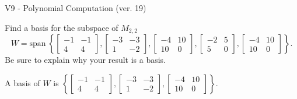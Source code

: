 \begin{exercise}
  \begin{exerciseTitle}V9 - Polynomial Computation (ver. 19)\end{exerciseTitle}
  \begin{exerciseStatement}
    Find a basis for the subspace of \(M_{2,2}\) 
\[W=\mathrm{span}\ \left\{\left[\begin{array}{cc}
-1 & -1 \\
4 & 4
\end{array}\right] , \left[\begin{array}{cc}
-3 & -3 \\
1 & -2
\end{array}\right] , \left[\begin{array}{cc}
-4 & 10 \\
10 & 0
\end{array}\right] , \left[\begin{array}{cc}
-2 & 5 \\
5 & 0
\end{array}\right] , \left[\begin{array}{cc}
-4 & 10 \\
10 & 0
\end{array}\right]\right\}.\]
 Be sure to explain why your result is a basis.


  \end{exerciseStatement}
  \begin{exerciseAnswer}
   A basis of \(W\) is  \(\left\{\left[\begin{array}{cc}
-1 & -1 \\
4 & 4
\end{array}\right] , \left[\begin{array}{cc}
-3 & -3 \\
1 & -2
\end{array}\right] , \left[\begin{array}{cc}
-4 & 10 \\
10 & 0
\end{array}\right]\right\}\).
  


  \end{exerciseAnswer}
\end{exercise}